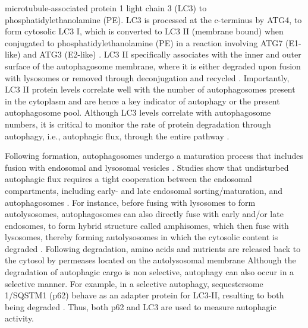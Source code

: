 microtubule-associated protein 1 light chain 3 (LC3) to phosphatidylethanolamine (PE). LC3 is processed at the c-terminus by ATG4, to form cytosolic LC3 I, which is converted to LC3 II (membrane bound) when conjugated to phosphatidylethanolamine (PE) in a reaction involving ATG7 (E1-like) and ATG3 (E2-like) \citep{kabeya2000,Tanida2004}. LC3 II specifically associates with the inner and outer surface of the autophagosome membrane, where it is either degraded upon fusion with lysosomes or removed through deconjugation and recycled \citep{kabeya2000,Mijaljica2012,Tanida2004}. Importantly, LC3 II protein levels correlate well with the number of autophagosomes present in the cytoplasm and are hence a key indicator of autophagy or the present autophagosome pool. Although LC3 levels correlate with autophagosome numbers, it is critical to monitor the rate of protein degradation through autophagy, i.e., autophagic flux, through the entire pathway \citep{klionsky2016,loos2014}. 

Following formation, autophagosomes undergo a maturation process that includes fusion with endosomal and lysosomal vesicles \citep{Eskelinen2005}. Studies show that undisturbed autophagic flux requires a tight cooperation between the endosomal compartments, including early- and late endosomal sorting/maturation, and autophagosomes \citep{Eskelinen2005}. For instance, before fusing with lysosomes to form autolysosomes, autophagosomes can also directly fuse with early and/or late endosomes, to form hybrid structure called amphisomes, which then fuse with lysosomes, thereby forming autolysosomes in which the cytosolic content is degraded \citep{Bell2006,Filimonenko2007,Liou1997}. Following degradation, amino acids and nutrients are released back to the cytosol by permeases located on the autolysosomal membrane \citep{Loos2013} Although the degradation of autophagic cargo is non selective, autophagy can also occur in a selective manner. For example, in a selective autophagy, sequestersome 1/SQSTM1 (p62) behave as an adapter protein for LC3-II, resulting to both being degraded \citep{Klionsky2005,Singh2011}. Thus, both p62 and LC3 are used to measure autophagic activity. 

